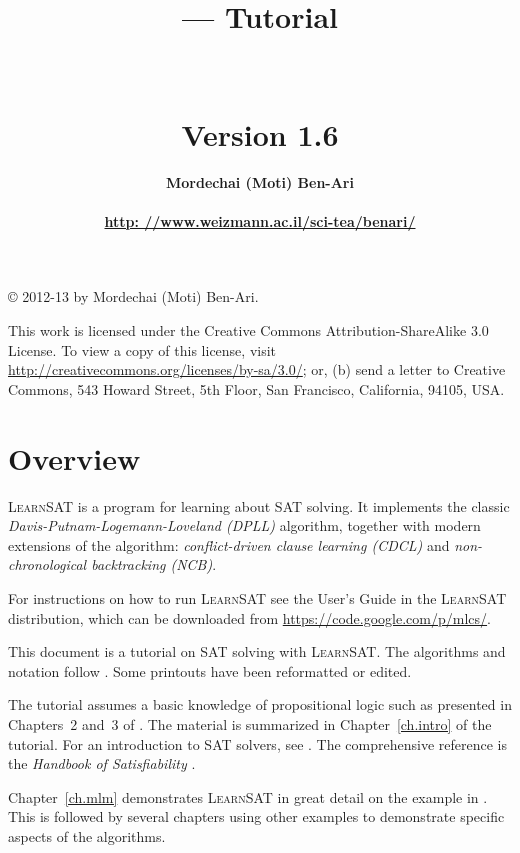 \documentclass[11pt]{report}
\title{\bfseries \ls --- Tutorial\\\mbox{}\\\mbox{}\\
\bfseries\normalsize Version 1.6}
\author{\bfseries Mordechai (Moti) Ben-Ari\\\mbox{}\\
\url{http: //www.weizmann.ac.il/sci-tea/benari/}}
\newcommand*{\ls}{\textsc{LearnSAT}}
\begin{document}

\maketitle

\thispagestyle{empty}

\vspace*{\fill}

\begin{center}
\copyright{} 2012-13 by Mordechai (Moti) Ben-Ari.
\end{center}
This work is licensed under the Creative Commons Attribution-ShareAlike 3.0
License. To view a copy of this license, visit
\url{http://creativecommons.org/licenses/by-sa/3.0/}; or, (b) send a letter
to Creative Commons, 543 Howard Street, 5th Floor, San Francisco,
California, 94105, USA.

\vspace*{\fill}

\setcounter{page}{0}
\newpage

\chapter*{Overview}

\ls{} is a program for learning about SAT solving. It implements the
classic \emph{Davis-Putnam-Logemann-Loveland (DPLL)} algorithm, together
with modern extensions of the algorithm: \emph{conflict-driven clause
learning (CDCL)} and \emph{non-chronological backtracking (NCB)}.

For instructions on how to run \ls{} see the User's Guide in the \ls{}
distribution, which can be downloaded from \url{https://code.google.com/p/mlcs/}.

This document is a tutorial on SAT solving with \ls{}. The algorithms
and notation follow \cite{mlm}. Some printouts have been reformatted or
edited.

The tutorial assumes a basic knowledge of propositional logic such as
presented in Chapters~2 and~3 of \cite{mlcs}. The material is
summarized in Chapter~\ref{ch.intro} of the tutorial. For an
introduction to SAT solvers, see \cite[Chapter~6]{mlcs}. The
comprehensive reference is the \emph{Handbook of Satisfiability}
\cite{SAT}.

Chapter~\ref{ch.mlm} demonstrates \ls{} in great detail on the example
in \cite{mlm}. This is followed by several chapters using other examples
to demonstrate specific aspects of the algorithms.
\end{document}
